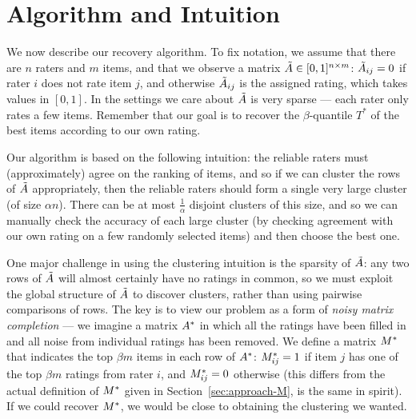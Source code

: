 \section{Algorithm and Intuition}
\vskip -0.08in
\label{sec:algorithm}



We now describe our recovery algorithm. To fix notation, we assume that 
there are $n$ raters and $m$ items, and that we observe a matrix 
$\tilde{A} \in [0,1]^{n \times m}$: 
$\tilde{A}_{ij} = 0$ if rater $i$ does not rate item $j$, and otherwise $\tilde{A}_{ij}$ 
is the assigned rating, which takes values 
in $[0,1]$. In the settings we 
care about $\tilde{A}$ is very sparse --- each rater only rates a few items.
Remember that our goal is to recover the $\beta$-quantile $T^*$ of the 
best items according to our own rating. 

Our algorithm is based on the following intuition: the reliable raters must 
(approximately) agree on the ranking of items, and so if we can cluster the 
rows of $\tilde{A}$ appropriately, then the reliable raters should form a single very large cluster 
(of size $\alpha n$). There can be at most $\frac{1}{\alpha}$ disjoint clusters of this size, and 
so we can manually check the accuracy of each large cluster (by checking agreement 
with our own rating on a few randomly selected items) and 
then choose the best one.

One major challenge in using the clustering intuition is the sparsity of 
$\tilde{A}$: any two rows of $\tilde{A}$ will almost certainly have no ratings in common, 
so we must exploit the global structure of $\tilde{A}$ to discover 
clusters, rather than using pairwise comparisons of rows.
The key is to view our problem as a form of \emph{noisy matrix completion} --- 
we imagine a matrix $A^*$ in which all the ratings have been filled in 
and all noise from individual ratings has been removed. We define a 
matrix $M^*$ that indicates the top $\beta m$ items in each row of $A^*$: 
$M^*_{ij} = 1$ if item $j$ has one of the top $\beta m$ ratings from rater $i$, 
and $M^*_{ij} = 0$ otherwise (this differs from the actual 
definition of $M^*$ given in Section~\ref{sec:approach-M}, is the same in spirit). If we could recover $M^*$, we would be 
close to obtaining the clustering we wanted.

